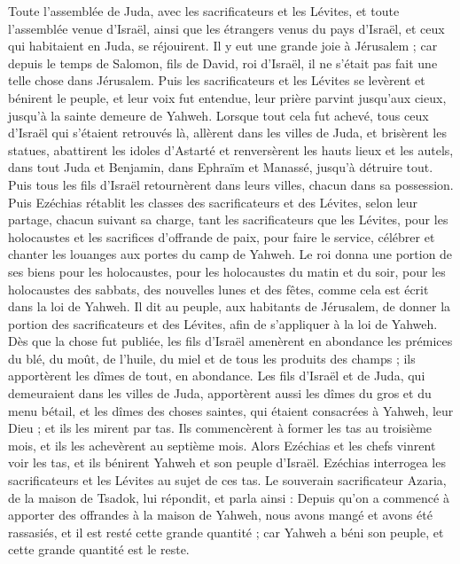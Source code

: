 \begin{multicols}{2}
Toute l'assemblée de Juda, avec les sacrificateurs et les Lévites, et toute l'assemblée venue d'Israël, ainsi que les étrangers venus du pays d'Israël, et ceux qui habitaient en Juda, se réjouirent.
Il y eut une grande joie à Jérusalem ; car depuis le temps de Salomon, fils de David, roi d'Israël, il ne s'était pas fait une telle chose dans Jérusalem.
Puis les sacrificateurs et les Lévites se levèrent et bénirent le peuple, et leur voix fut entendue, leur prière parvint jusqu'aux cieux, jusqu'à la sainte demeure de Yahweh.
\VerseOne{}Lorsque tout cela fut achevé, tous ceux d'Israël qui s’étaient retrouvés là, allèrent dans les villes de Juda, et brisèrent les statues, abattirent les idoles d'Astarté et renversèrent les hauts lieux et les autels, dans tout Juda et Benjamin, dans Ephraïm et Manassé, jusqu'à détruire tout. Puis tous les fils d’Israël retournèrent dans leurs villes, chacun dans sa possession.
Puis Ezéchias rétablit les classes des sacrificateurs et des Lévites, selon leur partage, chacun suivant sa charge, tant les sacrificateurs que les Lévites, pour les holocaustes et les sacrifices d’offrande de paix, pour faire le service, célébrer et chanter les louanges aux portes du camp de Yahweh.
Le roi donna une portion de ses biens pour les holocaustes, pour les holocaustes du matin et du soir, pour les holocaustes des sabbats, des nouvelles lunes et des fêtes, comme cela est écrit dans la loi de Yahweh.
Il dit au peuple, aux habitants de Jérusalem, de donner la portion des sacrificateurs et des Lévites, afin de s’appliquer à la loi de Yahweh.
Dès que la chose fut publiée, les fils d’Israël amenèrent en abondance les prémices du blé, du moût, de l'huile, du miel et de tous les produits des champs ; ils apportèrent les dîmes de tout, en abondance.
Les fils d’Israël et de Juda, qui demeuraient dans les villes de Juda, apportèrent aussi les dîmes du gros et du menu bétail, et les dîmes des choses saintes, qui étaient consacrées à Yahweh, leur Dieu ; et ils les mirent par tas.
Ils commencèrent à former les tas au troisième mois, et ils les achevèrent au septième mois.
Alors Ezéchias et les chefs vinrent voir les tas, et ils bénirent Yahweh et son peuple d'Israël.
Ezéchias interrogea les sacrificateurs et les Lévites au sujet de ces tas.
Le souverain sacrificateur Azaria, de la maison de Tsadok, lui répondit, et parla ainsi : Depuis qu'on a commencé  à apporter des offrandes à la maison de Yahweh, nous avons mangé et avons été rassasiés, et il est resté cette grande quantité ; car Yahweh a béni son peuple, et cette grande quantité est le reste.

\end{multicols}
